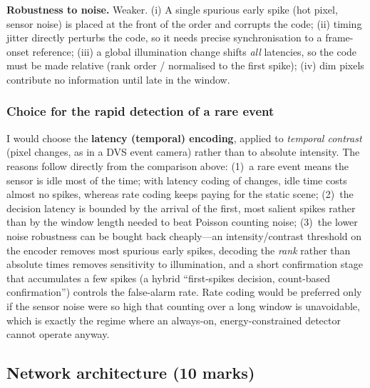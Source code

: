 \documentclass[11pt,a4paper]{article}
\begin{document}
\textbf{Robustness to noise.} Weaker. (i) A single spurious early spike (hot pixel, sensor noise) is placed at the front of the order and corrupts the code; (ii) timing jitter directly perturbs the code, so it needs precise synchronisation to a frame-onset reference; (iii) a global illumination change shifts \emph{all} latencies, so the code must be made relative (rank order / normalised to the first spike); (iv) dim pixels contribute no information until late in the window.

\subsubsection*{Choice for the rapid detection of a rare event}
I would choose the \textbf{latency (temporal) encoding}, applied to \emph{temporal contrast} (pixel changes, as in a DVS event camera) rather than to absolute intensity. The reasons follow directly from the comparison above: (1)~a rare event means the sensor is idle most of the time; with latency coding of changes, idle time costs almost no spikes, whereas rate coding keeps paying for the static scene; (2)~the decision latency is bounded by the arrival of the first, most salient spikes rather than by the window length needed to beat Poisson counting noise; (3)~the lower noise robustness can be bought back cheaply---an intensity/contrast threshold on the encoder removes most spurious early spikes, decoding the \emph{rank} rather than absolute times removes sensitivity to illumination, and a short confirmation stage that accumulates a few spikes (a hybrid ``first-spikes decision, count-based confirmation'') controls the false-alarm rate. Rate coding would be preferred only if the sensor noise were so high that counting over a long window is unavoidable, which is exactly the regime where an always-on, energy-constrained detector cannot operate anyway.

\subsection{Network architecture (10 marks)}
\end{document}
